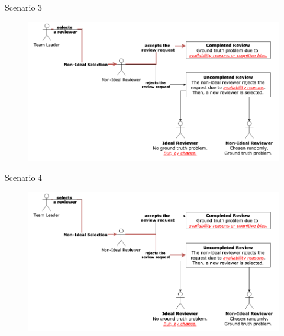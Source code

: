 \documentclass{beamer}
\begin{document}
\begin{frame}[noframenumbering]{\large Scenario 3}
      \begin{figure}
      \includegraphics[width=1.05\textwidth]{img/scenarios_3.png}
      \end{figure}
\end{frame}
\begin{frame}[noframenumbering]{\large Scenario 4}
      \begin{figure}
      \includegraphics[width=1.05\textwidth]{img/scenarios_4.png}
      \end{figure}
\end{frame}
\iffalse
\end{document}
